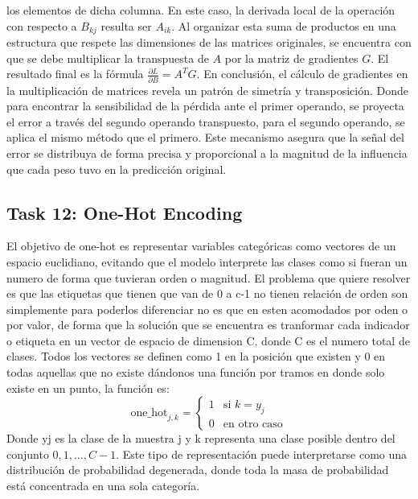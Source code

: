 \documentclass[12pt]{article}
\begin{document}
los elementos de dicha columna. En este caso, la derivada local de la operación
con respecto a $B_{kj}$ resulta ser $A_{ik}$. Al organizar esta suma de productos 
en una estructura que respete las dimensiones de las matrices originales, se encuentra
con que se debe multiplicar la transpuesta de $A$ por la matriz de 
gradientes $G$. El resultado final es la fórmula $\frac{\partial L}{\partial B} = A^T G$.
En conclusión, el cálculo de gradientes en la multiplicación de matrices revela un 
patrón de simetría y transposición. Donde para encontrar la sensibilidad de la pérdida ante el
primer operando, se proyecta el error a través del segundo operando transpuesto, para el 
segundo operando, se aplica el mismo método que el primero. Este mecanismo asegura que 
la señal del error se distribuya de forma precisa y proporcional a la magnitud de la
influencia que cada peso tuvo en la predicción original.

\subsection*{Task 12: One-Hot Encoding}
El objetivo de one-hot es representar variables categóricas como vectores de un espacio euclidiano, evitando que el modelo interprete las clases como si fueran un numero de forma que tuvieran orden o magnitud.
El problema que quiere resolver es que las etiquetas que tienen que van de 0 a c-1 no tienen relación de orden son simplemente para poderlos diferenciar no es que en esten acomodados por oden o por valor, de forma que la solución que se encuentra es tranformar cada indicador o etiqueta en un vector de espacio de dimension C, donde C es el numero total de clases. Todos los vectores se definen como 1 en la posición que existen y 0 en todas aquellas que no existe dándonos una función por tramos en donde solo existe en un punto, la función es:
\[
\text{one\_hot}_{j,k} =
\begin{cases}
1 & \text{si } k = y_j \\
0 & \text{en otro caso}
\end{cases}
\]
Donde yj es la clase de la muestra j y k representa una clase posible dentro del conjunto ${0,1,…,C-1}$.
Este tipo de representación puede interpretarse como una distribución de probabilidad degenerada, donde toda 
la masa de probabilidad está concentrada en una sola categoría.
\end{document}

